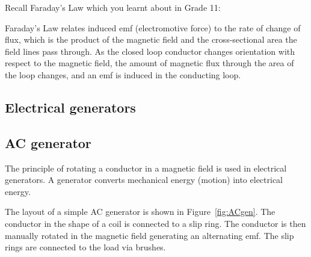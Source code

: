 Recall Faraday's Law which you learnt about in Grade 11:


Faraday's Law relates induced emf (electromotive force) to the rate of change of flux,
which is the product of the magnetic field and the cross-sectional
area the field lines pass through.
As the closed loop conductor changes orientation with respect to the magnetic field, the amount of magnetic flux through the area of the loop changes, and an emf is induced in the conducting loop. 


\subsection{Electrical generators}

\subsection*{AC generator}
The principle of rotating a conductor in a magnetic field is used in electrical generators. A generator converts mechanical energy (motion) into electrical energy.
 

The layout of a simple AC generator is shown in Figure~\ref{fig:ACgen}. The conductor in the shape of a coil is connected to a slip ring. The conductor is then manually rotated in the magnetic field generating an alternating emf. The slip rings are connected to the load via brushes.

